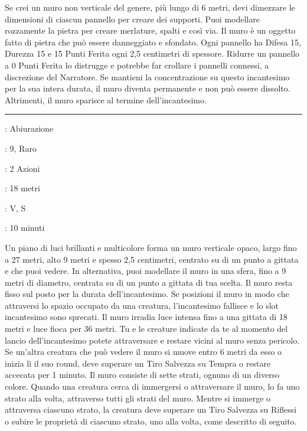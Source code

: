 \begin{multicols}{2}
Se crei un muro non verticale del genere, più lungo di 6 metri, devi dimezzare le dimensioni di ciascun pannello per creare dei supporti. Puoi modellare rozzamente la pietra per creare merlature, spalti e così via. Il muro è un oggetto fatto di pietra che può essere danneggiato e sfondato. Ogni pannello ha Difesa 15, Durezza 15 e 15 Punti Ferita ogni 2,5 centimetri di spessore. Ridurre un pannello a 0 Punti Ferita lo distrugge e potrebbe far crollare i pannelli connessi, a discrezione del Narratore. Se mantieni la concentrazione su questo incantesimo per la sua intera durata, il muro diventa permanente e non può essere dissolto. Altrimenti, il muro sparisce al termine dell'incantesimo.

\smallskip\noindent\rule{\linewidth}{2pt} \hypertarget{Muro Prismatico}{}\smallskip{}
\noindent
\begin{description}[noitemsep, topsep=0pt, parsep=0pt, partopsep=0pt, leftmargin=0cm, labelwidth=2.8cm]
	\item[\textbf{Lista di Magia}]: Abiurazione
	\item[\textbf{Livello}]: 9, Raro
	\item[\textbf{T. di Lancio}]: 2 Azioni
	\item[\textbf{Gittata}]: 18 metri
	\item[\textbf{Componenti}]: V, S
	\item[\textbf{Durata}]: 10 minuti
\end{description}

Un piano di luci brillanti e multicolore forma un muro verticale opaco, largo fino a 27 metri, alto 9 metri e spesso 2,5 centimetri, centrato su di un punto a gittata e che puoi vedere. In alternativa, puoi modellare il muro in una sfera, fino a 9 metri di diametro, centrata su di un punto a gittata di tua scelta. Il muro resta fisso sul posto per la durata dell'incantesimo. Se posizioni il muro in modo che attraversi lo spazio occupato da una creatura, l'incantesimo fallisce e lo slot incantesimo sono sprecati. Il muro irradia luce intensa fino a una gittata di 18 metri e luce fioca per 36 metri. Tu e le creature indicate da te al momento del lancio dell'incantesimo potete attraversare e restare vicini al muro senza pericolo. Se un'altra creatura che può vedere il muro si muove entro 6 metri da esso o inizia lì il suo round, deve superare un Tiro Salvezza su Tempra o restare accecata per 1 minuto. Il muro consiste di sette strati, ognuno di un diverso colore. Quando una creatura cerca di immergersi o attraversare il muro, lo fa uno strato alla volta, attraverso tutti gli strati del muro. Mentre si immerge o attraversa ciascuno strato, la creatura deve superare un Tiro Salvezza su Riflessi o subire le proprietà di ciascuno strato, uno alla volta, come descritto di seguito.


\end{multicols}
